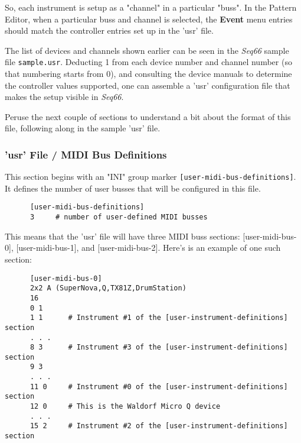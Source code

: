    So, each instrument is setup as a "channel" in a particular "buss".
   In the Pattern Editor, when a particular buss and channel is selected,
   the \textbf{Event} menu entries should match the controller entries set up
   in the 'usr' file.

   The list of devices and channels shown earlier
   can be seen in the \textsl{Seq66} sample file
   \texttt{sample.usr}.
   Deducting 1 from each device number and channel number (so that numbering
   starts from 0), and consulting the device manuals to determine the
   controller values supported, one can assemble a 'usr' configuration file
   that makes the setup visible in \textsl{Seq66}.

   Peruse the next couple of sections to understand a bit about the format of
   this file, following along in the sample 'usr' file.

\subsubsection{'usr' File / MIDI Bus Definitions}
\label{subsubsec:usr_file_midi_bus_definitions}

   This section begins with an
   "INI" group marker \texttt{[user-midi-bus-definitions]}.
   It defines the number of user busses that will be configured in this file.

   \begin{verbatim}
      [user-midi-bus-definitions]
      3     # number of user-defined MIDI busses
   \end{verbatim}

   This means that the 'usr' file will have three MIDI buss
   sections: [user-midi-bus-0], [user-midi-bus-1], and [user-midi-bus-2].
   Here's is an example of one such section:

   \begin{verbatim}
      [user-midi-bus-0]
      2x2 A (SuperNova,Q,TX81Z,DrumStation)
      16
      0 1
      1 1      # Instrument #1 of the [user-instrument-definitions] section
      . . .
      8 3      # Instrument #3 of the [user-instrument-definitions] section
      9 3
      . . .
      11 0     # Instrument #0 of the [user-instrument-definitions] section
      12 0     # This is the Waldorf Micro Q device
      . . .
      15 2     # Instrument #2 of the [user-instrument-definitions] section
   \end{verbatim}

